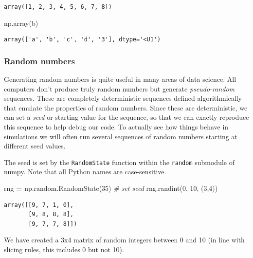 \documentclass[
  letterpaper,
]{scrbook}
\newenvironment{Shaded}{\begin{snugshade}}{\end{snugshade}}
\newcommand{\CommentTok}[1]{\textcolor[rgb]{0.56,0.35,0.01}{\textit{#1}}}
\newcommand{\DecValTok}[1]{\textcolor[rgb]{0.00,0.00,0.81}{#1}}
\newcommand{\NormalTok}[1]{#1}
\newcommand{\OperatorTok}[1]{\textcolor[rgb]{0.81,0.36,0.00}{\textbf{#1}}}
\begin{document}
\begin{verbatim}
array([1, 2, 3, 4, 5, 6, 7, 8])
\end{verbatim}

\begin{Shaded}
\begin{Highlighting}[]
\NormalTok{np.array(b)}
\end{Highlighting}
\end{Shaded}

\begin{verbatim}
array(['a', 'b', 'c', 'd', '3'], dtype='<U1')
\end{verbatim}

\hypertarget{random-numbers}{%
\subsubsection{Random numbers}\label{random-numbers}}

Generating random numbers is quite useful in many areas of data science. All computers don't produce truly random numbers but generate \emph{pseudo-random} sequences. These are completely deterministic sequences defined algorithmically that emulate the properties of random numbers. Since these are deterministic, we can set a \emph{seed} or starting value for the sequence, so that we can exactly reproduce this sequence to help debug our code. To actually see how things behave in simulations we will often run several sequences of random numbers starting at different seed values.

The seed is set by the \texttt{RandomState} function within the \texttt{random} submodule of numpy. Note that all Python names are case-sensitive.

\begin{Shaded}
\begin{Highlighting}[]
\NormalTok{rng }\OperatorTok{=}\NormalTok{ np.random.RandomState(}\DecValTok{35}\NormalTok{) }\CommentTok{# set seed}
\NormalTok{rng.randint(}\DecValTok{0}\NormalTok{, }\DecValTok{10}\NormalTok{, (}\DecValTok{3}\NormalTok{,}\DecValTok{4}\NormalTok{))}
\end{Highlighting}
\end{Shaded}

\begin{verbatim}
array([[9, 7, 1, 0],
       [9, 8, 8, 8],
       [9, 7, 7, 8]])
\end{verbatim}

We have created a 3x4 matrix of random integers between 0 and 10 (in line with slicing rules, this includes 0 but not 10).
\end{document}

